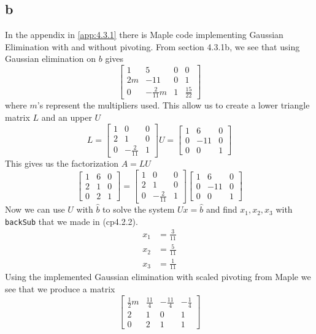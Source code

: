 \documentclass[12pt]{article}
\begin{document}
\subsection*{b}
In the appendix in \ref{app:4.3.1} there is Maple code implementing Gaussian Elimination with and without pivoting. From section 4.3.1b, we see that using Gaussian elimination on $b$ gives
$$
\begin{bmatrix}
1 & 5 & 0 & 0\\
2m & -11 & 0 & 1 \\
0 & -\frac{2}{11}m & 1 & \frac{15}{22}
\end{bmatrix}
$$
where $m$'s represent the multipliers used. This allow us to create a lower triangle matrix $L$ and an upper $U$
$$
L
=
\begin{bmatrix}
1 & 0 & 0\\
2 & 1 & 0 \\
0 & -\frac{2}{11} & 1 
\end{bmatrix}
U
=
\begin{bmatrix}
1 & 6 & 0\\
0 & -11 & 0 \\
0 & 0 & 1 
\end{bmatrix}
$$
This gives us the factorization $A=LU$
$$
\begin{bmatrix}
1 & 6 & 0\\
2 & 1 & 0 \\
0 & 2 & 1 
\end{bmatrix}
=
\begin{bmatrix}
1 & 0 & 0\\
2 & 1 & 0 \\
0 & -\frac{2}{11} & 1 
\end{bmatrix}
\begin{bmatrix}
1 & 6 & 0\\
0 & -11 & 0 \\
0 & 0 & 1 
\end{bmatrix}
$$
Now we can use $U$ with $\hat{b}$ to solve the system $Ux=\hat{b}$ and find $x_1,x_2,x_3$ with \texttt{backSub} that we made in (cp4.2.2).
\begin{align*}
x_1&=\frac{3}{11} \\
x_2&=\frac{5}{11} \\
x_3&=\frac{1}{11}
\end{align*}
Using the implemented Gaussian elimination with scaled pivoting from Maple we see that we produce a matrix
$$
\begin{bmatrix}
\frac{1}{2}m & \frac{11}{4} & -\frac{11}{4} & -\frac{1}{4} \\
2 & 1 & 0 & 1\\ 
0 & 2 & 1 & 1
\end{bmatrix}
$$
\end{document}
